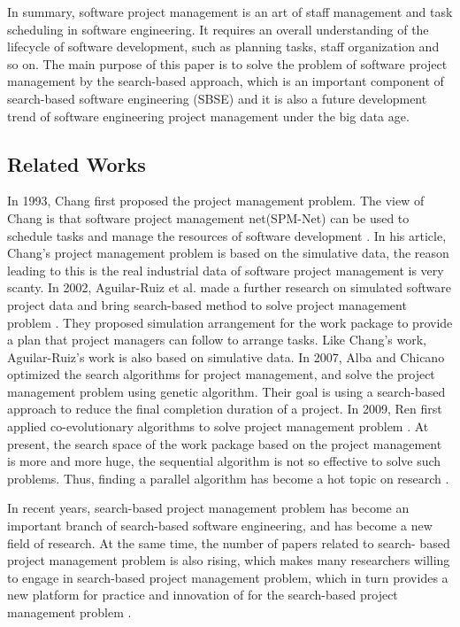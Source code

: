 In summary, software project management is an art of staff management and task
scheduling in software engineering. It requires an overall understanding of the
lifecycle of software development, such as planning tasks, staff organization
and so on. The main purpose of this paper is to solve the problem of software
project management by the search-based approach, which is an important component
of search-based software engineering (SBSE) and it is also a future development
trend of software engineering project management under the big data age.


\subsection{Related Works}
%
In 1993, Chang first proposed the project management problem. The view of 
Chang is that software project management net(SPM-Net) can be used to 
schedule tasks and manage the resources of software development \cite{chang}. 
In his article, Chang's project management problem is based on the simulative 
data, the reason leading to this is the real industrial data of software 
project management is very scanty. In 2002, Aguilar-Ruiz et al. made a 
further research on simulated software project data and bring search-based 
method to solve project management problem \cite{alba}. They proposed 
simulation arrangement for the work package to provide a plan that project 
managers can follow to arrange tasks. Like Chang’s work, Aguilar-Ruiz's work 
is also based on simulative data. In 2007, Alba and Chicano optimized the 
search algorithms for project management, and solve the project management 
problem using genetic algorithm. Their goal is using a search-based approach 
to reduce the final completion duration of a project. In 2009, Ren first 
applied co-evolutionary algorithms to solve project management problem \cite{
ren}. At present, the search space of the work package based on the project 
management is more and more huge, the sequential algorithm is not so 
effective to solve such problems. Thus, finding a parallel algorithm has 
become a hot topic on research \cite{pentico}.


In recent years, search-based project management problem has become an 
important branch of search-based software engineering, and has become a new 
field of research. At the same time, the number of papers related to search-
based project management problem is also rising, which makes many researchers 
willing to engage in search-based project management problem, which in turn 
provides a new platform for practice and innovation of for the search-based 
project management problem \cite{penta}.


